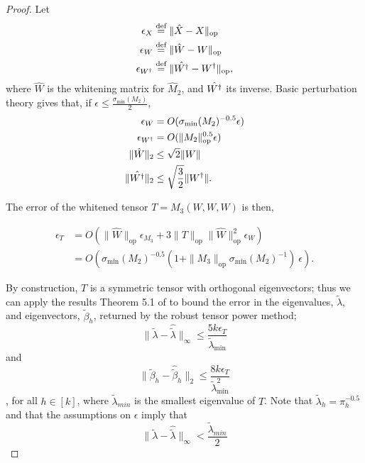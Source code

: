 \documentclass[tablecaption=bottom]{jmlr}
\newcommand\eqdef{\ensuremath{\stackrel{\textrm{def}}{=}}} %
\newcommand\sigmamin{\sigma_\textrm{min}}
\newcommand{\Lop}{\textrm{op}}
\begin{document}
\begin{proof}
Let 
\begin{align}
\epsilon_{X} &\eqdef \|\hat X - X\|_\Lop \\
\epsilon_W &\eqdef \|\hat W - W\|_\Lop \\
\epsilon_{\Winv} &\eqdef \|\hat \Winv - \Winv\|_\Lop,
\end{align}
where $\hat W$ is the whitening
matrix for $\hat M_2$, and $\hat {W^{\dagger}}$ its inverse. 
Basic perturbation theory gives that, if $\epsilon \le \frac{\sigmamin(M_2)}{2}$,
\begin{align}
\epsilon_W &= O(\sigmamin(M_2)^{-0.5} \epsilon) \\
\epsilon_{\Winv} &= O(\|M_2\|_\Lop^{0.5} \epsilon) \\
\|\hat W\|_2 &\le \sqrt{2} \|W\| \\
\|\hat \Winv\|_2 &\le \sqrt\frac{3}{2} \|\Winv\|.
\end{align}

The error of the whitened tensor $T = M_3(W,W,W)$ is then, 

\begin{align}
\epsilon_T &= O( \|\hat W\|_\Lop \epsilon_{M_3} + 3 \|T\|_\Lop \|\hat W\|_\Lop^2 \epsilon_{W}  )  \\
  &= O(\sigmamin(M_2)^{-0.5} (1 + \|M_3\|_\Lop \sigmamin(M_2)^{-1} )~\epsilon).
\end{align}

By construction, $T$ is a symmetric tensor with orthogonal eigenvectors;
thus we can apply the results Theorem 5.1 of \citet{AnandkumarGeHsu2012}
to bound the error in the eigenvalues, $\tilde \lambda$, and eigenvectors, $\tilde \beta_h$, returned by the
robust tensor power method; 
$$\|\tilde \lambda - \hat {\tilde \lambda} \|_{\infty} \le \frac{5 k \epsilon_T}{\tilde \lambda_{\min}}$$
and
$$\|\tilde \beta_h - \hat {\tilde \beta}_h \|_2 \le \frac{8 k \epsilon_T}{\tilde \lambda_{\min}^2}$$,
for all $h \in [k]$, where $\tilde \lambda_{min}$ is the smallest
eigenvalue of $T$. Note that $\tilde \lambda_h = \pi_h^{-0.5}$ and that
the assumptions on $\epsilon$ imply that $$\|\tilde \lambda - \hat
{\tilde \lambda} \|_{\infty} < \frac{\tilde \lambda_{min}}{2}$$


\end{proof}
\end{document}
